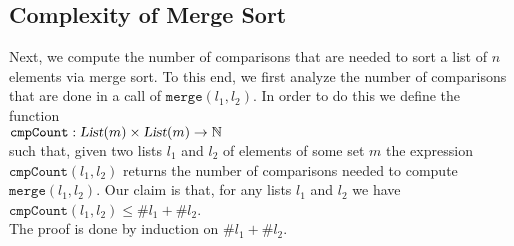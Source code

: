 \subsection{Complexity of Merge Sort}
Next, we compute the number of comparisons that are needed to sort a list of $n$
elements via merge sort.  To this end, we first analyze the number of comparisons that 
are done in a call of $\mathtt{merge}(l_1, l_2)$.   In order to do this we define the function \\[0.2cm]
\hspace*{1.3cm} 
$\mathtt{cmpCount}: \textsl{List}(m) \times \textsl{List}(m) \rightarrow \mathbb{N}$ 
\\[0.2cm]
such that, given two lists $l_1$ and $l_2$ of elements of some set $m$ the expression $\mathtt{cmpCount}(l_1, l_2)$ returns the
number of comparisons needed to compute $\texttt{merge}(l_1,l_2)$. 
Our claim is that, for any lists $l_1$ and $l_2$ we have  
\\[0.2cm]
\hspace*{1.3cm}
$\mathtt{cmpCount}(l_1, l_2) \leq \# l_1 + \# l_2$. 
\\[0.2cm]
The proof is done by induction on $\#l_1 + \#l_2$.
